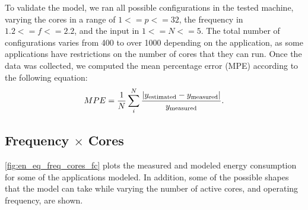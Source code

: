 To validate the model, we ran all possible configurations in the tested machine, varying the cores in a range of $1<=p<=32$, the frequency in $1.2<=f<=2.2$, and the input in $1<=N<=5$. The total number of configurations varies from 400 to over 1000 depending on the application, as some applications have restrictions on the number of cores that they can run. Once the data was collected, we computed the mean percentage error (MPE) according to the following equation:
\begin{equation}
	MPE = \frac{1}{N} \sum_i^N \frac{|y_{\rm estimated}-y_{\rm measured}|}{y_{\rm measured}}.
	\label{eq:mpe}
\end{equation}

\subsection{Frequency $\times$ Cores}
\cref{fig:en_eq_freq_cores_fc} plots the measured and modeled energy consumption for some of the applications modeled. In addition,  some of the possible shapes that the model can take while varying the number of active cores, and operating frequency, are shown.%

